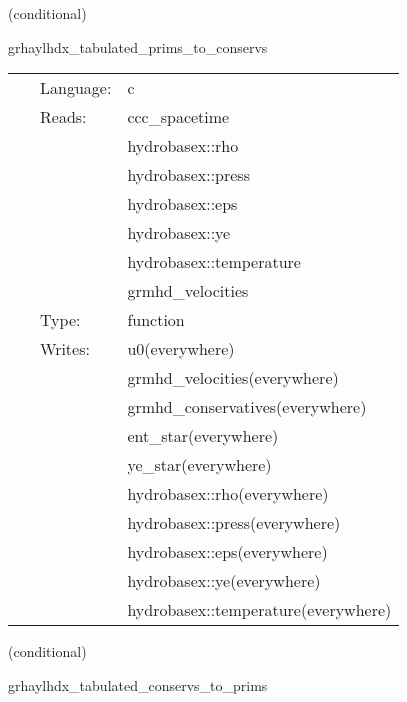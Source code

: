 \documentclass{article}
\begin{document}
\vspace{5mm}

   (conditional) 

\hspace{5mm} grhaylhdx\_tabulated\_prims\_to\_conservs 

\hspace{5mm}{\it tabulated version of grhaylhdx\_prims\_to\_conservs } 


\hspace{5mm}

 \begin{tabular*}{160mm}{cll} 
~ & Language:  & c \\ 
~ & Reads:  & ccc\_spacetime \\ 
~& ~ &hydrobasex::rho\\ 
~& ~ &hydrobasex::press\\ 
~& ~ &hydrobasex::eps\\ 
~& ~ &hydrobasex::ye\\ 
~& ~ &hydrobasex::temperature\\ 
~& ~ &grmhd\_velocities\\ 
~ & Type:  & function \\ 
~ & Writes:  & u0(everywhere) \\ 
~& ~ &grmhd\_velocities(everywhere)\\ 
~& ~ &grmhd\_conservatives(everywhere)\\ 
~& ~ &ent\_star(everywhere)\\ 
~& ~ &ye\_star(everywhere)\\ 
~& ~ &hydrobasex::rho(everywhere)\\ 
~& ~ &hydrobasex::press(everywhere)\\ 
~& ~ &hydrobasex::eps(everywhere)\\ 
~& ~ &hydrobasex::ye(everywhere)\\ 
~& ~ &hydrobasex::temperature(everywhere)\\ 
\end{tabular*} 


\vspace{5mm}

   (conditional) 

\hspace{5mm} grhaylhdx\_tabulated\_conservs\_to\_prims 

\hspace{5mm}{\it tabulated version of grhaylhdx\_conservs\_to\_prims } 
\end{document}
